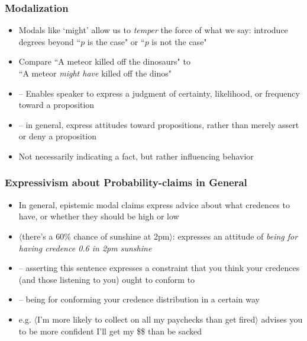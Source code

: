 \begin{frame}
\frametitle{Modalization}

\begin{itemize}[<+->]

\item Modals like `might' allow us to \textit{temper} the force of what we say: introduce degrees beyond ``$p$ is the case" or ``$p$ is not the case"

\item Compare ``A meteor killed off the dinosaurs" to \\ ``A meteor \textit{might have} killed off the dinos"

\item[] -- Enables speaker to express a judgment of certainty, likelihood, or frequency toward a proposition

\item[] -- in general, express attitudes toward propositions, rather than merely assert or deny a proposition 

\item Not necessarily indicating a fact, but rather influencing behavior

\end{itemize}
\end{frame}

\begin{frame}
\frametitle{Expressivism about Probability-claims in General}


\begin{itemize}[<+->]


\item In general, epistemic modal claims express advice about what credences to have, or whether they should be high or low

\item $\langle$there's a 60\% chance of sunshine at 2pm$\rangle$: expresses an attitude of \textit{being for having credence 0.6 in 2pm sunshine}

\item[] -- asserting this sentence expresses a constraint that you think your credences (and those listening to you) ought to conform to

\item[] -- being for conforming your credence distribution in a certain way 

\item e.g. $\langle$I'm more likely to collect on all my paychecks than get fired$\rangle$ advises you to be more confident I'll get my \$\$ than be sacked 


\end{itemize}
\end{frame}



